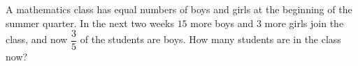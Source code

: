 A mathematics class has equal numbers of boys and girls at the beginning of the summer quarter. In the next two weeks $15$ more boys and $3$ more girls join the class, and now $\dfrac{3}{5}$ of the students are boys. How many students are in the class now?
